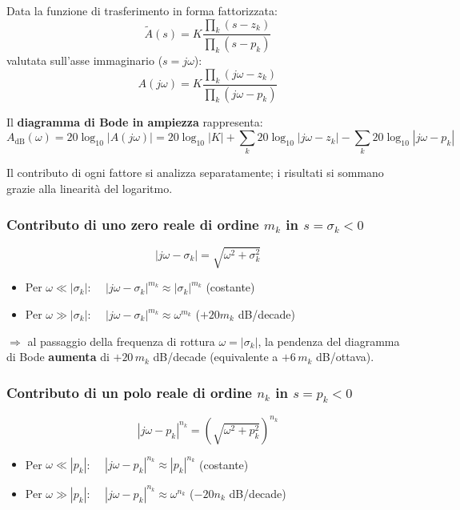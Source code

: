 Data la funzione di trasferimento in forma fattorizzata:
\[
    \tilde{A}(s) = K \frac{\prod_k (s - z_k)}{\prod_k (s - p_k)}
\]
valutata sull'asse immaginario ($s = j\omega$):
\[
    A(j\omega) = K \frac{\prod_k (j\omega - z_k)}{\prod_k (j\omega - p_k)}
\]

Il \textbf{diagramma di Bode in ampiezza} rappresenta:
\[
    A_{\text{dB}}(\omega) = 20\log_{10}|A(j\omega)| = 20\log_{10}|K| + \sum_k 20\log_{10}|j\omega - z_k| - \sum_k 20\log_{10}|j\omega - p_k|
\]

Il contributo di ogni fattore si analizza separatamente; i risultati si sommano grazie alla linearità del logaritmo.

\subsubsection*{Contributo di uno zero reale di ordine $m_k$ in $s = \sigma_k < 0$}

\[
    |j\omega - \sigma_k| = \sqrt{\omega^2 + \sigma_k^2}
\]

\begin{itemize}
    \item Per $\omega \ll |\sigma_k|$: $\quad |j\omega - \sigma_k|^{m_k} \approx |\sigma_k|^{m_k}$ \quad(costante)
    \item Per $\omega \gg |\sigma_k|$: $\quad |j\omega - \sigma_k|^{m_k} \approx \omega^{m_k}$ \quad($+20m_k$ dB/decade)
\end{itemize}

$\Rightarrow$ al passaggio della frequenza di rottura $\omega = |\sigma_k|$, la pendenza del diagramma di Bode \textbf{aumenta} di $+20\,m_k$ dB/decade (equivalente a $+6\,m_k$ dB/ottava).

\subsubsection*{Contributo di un polo reale di ordine $n_k$ in $s = p_k < 0$}

\[
    |j\omega - p_k|^{n_k} = \left(\sqrt{\omega^2 + p_k^2}\right)^{n_k}
\]

\begin{itemize}
    \item Per $\omega \ll |p_k|$: $\quad |j\omega - p_k|^{n_k} \approx |p_k|^{n_k}$ \quad(costante)
    \item Per $\omega \gg |p_k|$: $\quad |j\omega - p_k|^{n_k} \approx \omega^{n_k}$ \quad($-20n_k$ dB/decade)
\end{itemize}

